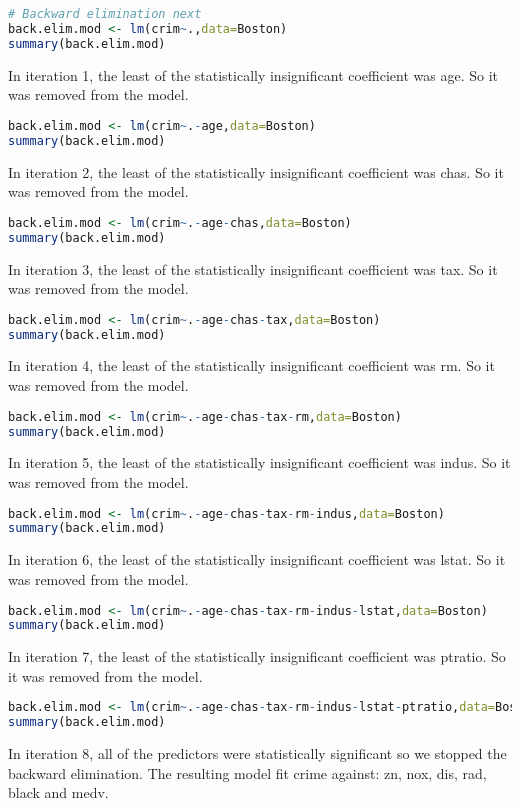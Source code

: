 \documentclass[11pt]{report}
\begin{document}
\begin{itemize}
\begin{lstlisting}[language=R]
# Backward elimination next
back.elim.mod <- lm(crim~.,data=Boston)
summary(back.elim.mod)
\end{lstlisting}
In iteration 1, the least of the statistically insignificant coefficient was age. So it was removed from the model.
\begin{lstlisting}[language=R]
back.elim.mod <- lm(crim~.-age,data=Boston)
summary(back.elim.mod)
\end{lstlisting}
In iteration 2, the least of the statistically insignificant coefficient was chas. So it was removed from the model.
\begin{lstlisting}[language=R]
back.elim.mod <- lm(crim~.-age-chas,data=Boston)
summary(back.elim.mod)
\end{lstlisting}
In iteration 3, the least of the statistically insignificant coefficient was tax. So it was removed from the model.
\begin{lstlisting}[language=R]
back.elim.mod <- lm(crim~.-age-chas-tax,data=Boston)
summary(back.elim.mod)
\end{lstlisting}
In iteration 4, the least of the statistically insignificant coefficient was rm. So it was removed from the model.
\begin{lstlisting}[language=R]
back.elim.mod <- lm(crim~.-age-chas-tax-rm,data=Boston)
summary(back.elim.mod)
\end{lstlisting}
In iteration 5, the least of the statistically insignificant coefficient was indus. So it was removed from the model.
\begin{lstlisting}[language=R]
back.elim.mod <- lm(crim~.-age-chas-tax-rm-indus,data=Boston)
summary(back.elim.mod)
\end{lstlisting}
In iteration 6, the least of the statistically insignificant coefficient was lstat. So it was removed from the model.
\begin{lstlisting}[language=R]
back.elim.mod <- lm(crim~.-age-chas-tax-rm-indus-lstat,data=Boston)
summary(back.elim.mod)
\end{lstlisting}
In iteration 7, the least of the statistically insignificant coefficient was ptratio. So it was removed from the model.
\begin{lstlisting}[language=R]
back.elim.mod <- lm(crim~.-age-chas-tax-rm-indus-lstat-ptratio,data=Boston)
summary(back.elim.mod)
\end{lstlisting}
In iteration 8, all of the predictors were statistically significant so we stopped the backward elimination. The resulting model fit crime against: zn, nox, dis, rad, black and medv.

\end{itemize}
\end{document}
